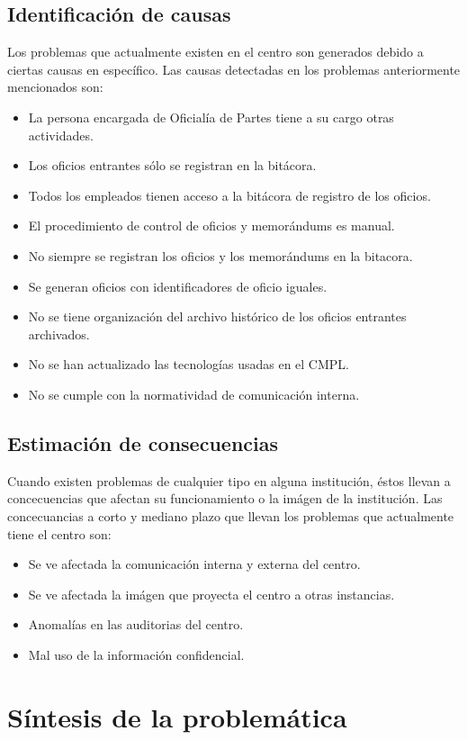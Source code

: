 	\subsection{Identificación de causas}
	Los problemas que actualmente existen en el centro son generados debido a ciertas causas en específico. Las causas detectadas en los problemas anteriormente mencionados son:

\begin{itemize}
	
	\item La persona encargada de Oficialía de Partes tiene a su cargo otras actividades.
	\item Los oficios entrantes sólo se registran en la bitácora.
	\item Todos los empleados tienen acceso a la bitácora de registro de los oficios.
	\item El procedimiento de control de oficios y memorándums es manual.
	\item No siempre se registran los oficios y los memorándums en la bitacora.
	\item Se generan oficios con identificadores de oficio iguales.
	\item No se tiene organización del archivo histórico de los oficios entrantes archivados.
	\item No se han actualizado las tecnologías usadas en el CMPL.
	\item No se cumple con la normatividad de comunicación interna.
	
\end{itemize}
	\subsection{Estimación de consecuencias}
	Cuando existen problemas de cualquier tipo en alguna institución, éstos llevan a concecuencias que afectan su funcionamiento o la imágen de la institución. Las concecuancias a corto y mediano plazo que llevan los problemas que actualmente tiene el centro son:

\begin{itemize}
	\item Se ve afectada la comunicación interna y externa del centro.
	\item Se ve afectada la imágen que proyecta el centro a otras instancias.
	\item Anomalías en las auditorias del centro.
	\item Mal uso de la información confidencial.
\end{itemize}
\section{Síntesis de la problemática}




